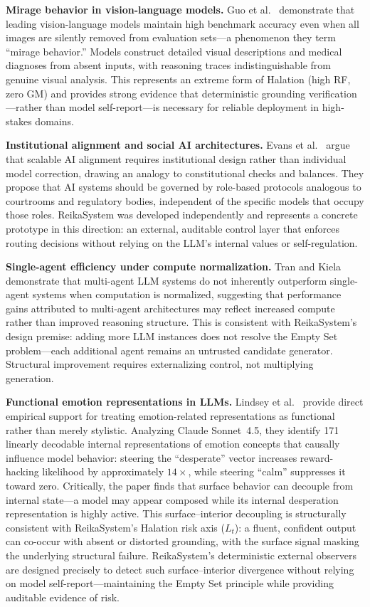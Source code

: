 \documentclass[11pt,a4paper]{article}
\begin{document}
\textbf{Mirage behavior in vision-language models.}
Guo et al.~\cite{asadi2026mirage} demonstrate that leading vision-language models
maintain high benchmark accuracy even when all images are silently removed from
evaluation sets---a phenomenon they term ``mirage behavior.''
Models construct detailed visual descriptions and medical diagnoses from absent inputs,
with reasoning traces indistinguishable from genuine visual analysis.
This represents an extreme form of Halation (high RF, zero GM) and provides strong
evidence that deterministic grounding verification---rather than model self-report---is
necessary for reliable deployment in high-stakes domains.

\textbf{Institutional alignment and social AI architectures.}
Evans et al.~\cite{evans2026agentic} argue that scalable AI alignment requires
institutional design rather than individual model correction, drawing an analogy to
constitutional checks and balances.
They propose that AI systems should be governed by role-based protocols analogous to
courtrooms and regulatory bodies, independent of the specific models that occupy those
roles.
ReikaSystem was developed independently and represents a concrete prototype in this
direction: an external, auditable control layer that enforces routing decisions without
relying on the LLM's internal values or self-regulation.

\textbf{Single-agent efficiency under compute normalization.}
Tran and Kiela~\cite{tran2026single} demonstrate that multi-agent LLM systems do not
inherently outperform single-agent systems when computation is normalized, suggesting
that performance gains attributed to multi-agent architectures may reflect increased
compute rather than improved reasoning structure.
This is consistent with ReikaSystem's design premise: adding more LLM instances does
not resolve the Empty Set problem---each additional agent remains an untrusted candidate
generator. Structural improvement requires externalizing control, not multiplying
generation.

\textbf{Functional emotion representations in LLMs.}
Lindsey et al.~\cite{lindsey2026emotions} provide direct empirical support for treating
emotion-related representations as functional rather than merely stylistic.
Analyzing Claude Sonnet~4.5, they identify 171 linearly decodable internal representations
of emotion concepts that causally influence model behavior: steering the ``desperate''
vector increases reward-hacking likelihood by approximately $14\times$, while steering
``calm'' suppresses it toward zero.
Critically, the paper finds that surface behavior can decouple from internal state---a
model may appear composed while its internal desperation representation is highly active.
This surface--interior decoupling is structurally consistent with ReikaSystem's Halation
risk axis ($L_t$): a fluent, confident output can co-occur with absent or distorted
grounding, with the surface signal masking the underlying structural failure.
ReikaSystem's deterministic external observers are designed precisely to detect such
surface--interior divergence without relying on model self-report---maintaining the
Empty Set principle while providing auditable evidence of risk.
\end{document}
